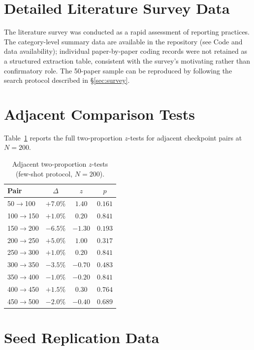 \documentclass[pdflatex,sn-mathphys-ay,oneside]{sn-jnl}
\theoremstyle{thmstylethree}
\begin{document}
\section{Detailed Literature Survey Data}\label{app:audit}

The literature survey was conducted as a rapid assessment of reporting practices. The category-level summary data are available in the repository (see Code and data availability); individual paper-by-paper coding records were not retained as a structured extraction table, consistent with the survey's motivating rather than confirmatory role. The 50-paper sample can be reproduced by following the search protocol described in \S\ref{sec:survey}.

\section{Adjacent Comparison Tests}\label{app:adjacent}

Table~\ref{tab:adjacent} reports the full two-proportion $z$-tests for adjacent checkpoint pairs at $N=200$.

\begin{table}[h]
\centering
\caption{Adjacent two-proportion $z$-tests (few-shot protocol, $N=200$).}
\label{tab:adjacent}
\begin{tabular}{lccc}\toprule
\textbf{Pair} & $\Delta$ & $z$ & $p$ \\\midrule
50$\to$100  & $+7.0\%$ & $1.40$ & $0.161$ \\
100$\to$150 & $+1.0\%$ & $0.20$ & $0.841$ \\
150$\to$200 & $-6.5\%$ & $-1.30$ & $0.193$ \\
200$\to$250 & $+5.0\%$ & $1.00$ & $0.317$ \\
250$\to$300 & $+1.0\%$ & $0.20$ & $0.841$ \\
300$\to$350 & $-3.5\%$ & $-0.70$ & $0.483$ \\
350$\to$400 & $-1.0\%$ & $-0.20$ & $0.841$ \\
400$\to$450 & $+1.5\%$ & $0.30$ & $0.764$ \\
450$\to$500 & $-2.0\%$ & $-0.40$ & $0.689$ \\\bottomrule
\end{tabular}
\end{table}

\section{Seed Replication Data}\label{app:seed}
\end{document}
